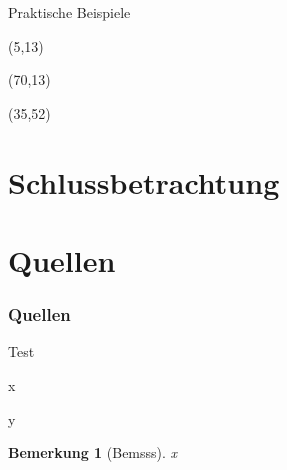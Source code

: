 \documentclass{beamer}
\newcommand{\adjustTikzSize}[0]{\Large}
\newcommand{\tikzScale}[0]{0.55}
\newtheorem*{bem}{Bemerkung}
\begin{document}
\begin{frame}{Praktische Beispiele}
\begin{textblock}{10}(5,13)
	\scalebox{\tikzScale}{\adjustTikzSize }
\end{textblock}
\begin{textblock}{10}(70,13)
	\scalebox{\tikzScale}{\adjustTikzSize }
\end{textblock}
\begin{textblock}{10}(35,52)
	\scalebox{\tikzScale}{\adjustTikzSize }
\end{textblock}
\end{frame}

\section{Schlussbetrachtung}
\begin{frame}

\end{frame}

\section*{Quellen}
\begin{frame}
\frametitle{Quellen}
\def\bibfont{\scriptsize}
\printbibliography
\end{frame}

\begin{frame}{Test}

x
\begin{definition}[Definition]
y
\end{definition}

\begin{bem}[Bemsss]
x
\end{bem}
\end{frame}
\end{document}
